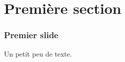 







\begin{frame}
	\titlepage{}
\end{frame}

\section{Première section}

\begin{frame}
	\frametitle{Premier slide}
	Un petit peu de texte.
\end{frame}


